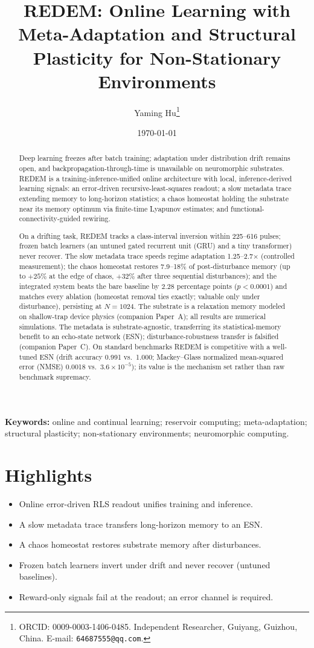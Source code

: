 \documentclass[11pt]{article}
\title{REDEM: Online Learning with Meta-Adaptation and Structural
Plasticity for Non-Stationary Environments}
\author{Yaming Hu\thanks{ORCID: 0009-0003-1406-0485. Independent
Researcher, Guiyang, Guizhou, China. E-mail:
\texttt{64687555@qq.com}.}}
\date{\today}
\begin{document}
\maketitle

\begin{abstract}
Deep learning freezes after batch training; adaptation under distribution
drift remains open, and backpropagation-through-time is unavailable on
neuromorphic substrates. REDEM is a training-inference-unified online
architecture with local, inference-derived learning signals: an error-driven
recursive-least-squares readout; a slow metadata trace extending memory to
long-horizon statistics; a chaos homeostat holding the substrate near its
memory optimum via finite-time Lyapunov estimates; and
functional-connectivity-guided rewiring.

On a drifting task, REDEM tracks a class-interval inversion within 225--616
pulses; frozen batch learners (an untuned gated recurrent unit (GRU) and a tiny
transformer) never recover. The slow metadata trace speeds regime adaptation
1.25--2.7$\times$ (controlled measurement); the chaos homeostat restores
7.9--18\% of post-disturbance memory (up to $+25\%$ at the edge of chaos,
$+32\%$ after three sequential disturbances); and the integrated system beats
the bare baseline by 2.28 percentage points ($p<0.0001$) and matches every
ablation (homeostat removal ties exactly; valuable only under disturbance),
persisting at $N=1024$. The substrate is a relaxation memory
modeled on shallow-trap device physics (companion Paper~A); all results are
numerical simulations. The metadata is substrate-agnostic,
transferring its statistical-memory benefit to an echo-state network (ESN);
disturbance-robustness transfer is falsified (companion Paper~C). On
standard benchmarks REDEM is competitive with a well-tuned ESN (drift
accuracy 0.991 vs.\ 1.000; Mackey--Glass normalized mean-squared error
(NMSE) 0.0018 vs.\ $3.6\times10^{-5}$); its value is the mechanism set
rather than raw benchmark supremacy.
\end{abstract}

\noindent\textbf{Keywords:} online and continual learning; reservoir
computing; meta-adaptation; structural plasticity; non-stationary environments;
neuromorphic computing.

\section*{Highlights}
\begin{itemize}
\item Online error-driven RLS readout unifies training and inference.
\item A slow metadata trace transfers long-horizon memory to an ESN.
\item A chaos homeostat restores substrate memory after disturbances.
\item Frozen batch learners invert under drift and never recover (untuned baselines).
\item Reward-only signals fail at the readout; an error channel is required.
\end{itemize}
\end{document}
